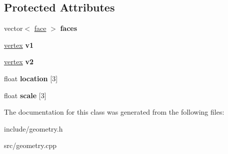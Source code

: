 \subsection*{Protected Attributes}
\begin{DoxyCompactItemize}
\item 
\mbox{\label{classedge_ae2e5280a9a1f2519d070a9ae95e2d40d}} 
vector$<$ \hyperlink{classface}{face} $>$ {\bfseries faces}
\item 
\mbox{\label{classedge_a0209c03c9479528b2e060d4d0e58b461}} 
\hyperlink{classvertex}{vertex} {\bfseries v1}
\item 
\mbox{\label{classedge_a5b849de3794f7e5126fc8f03199d568c}} 
\hyperlink{classvertex}{vertex} {\bfseries v2}
\item 
\mbox{\label{classedge_ab1adb65641c26fbb6b5a4f0d2d15ba6b}} 
float {\bfseries location} \mbox{[}3\mbox{]}
\item 
\mbox{\label{classedge_a7f28a6bc883fe629bbd4e90b2f5d7bdd}} 
float {\bfseries scale} \mbox{[}3\mbox{]}
\end{DoxyCompactItemize}


The documentation for this class was generated from the following files\+:\begin{DoxyCompactItemize}
\item 
include/geometry.\+h\item 
src/geometry.\+cpp\end{DoxyCompactItemize}
